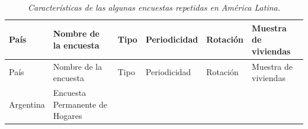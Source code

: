 \documentclass[12pt,spanish,]{book}
\begin{document}
\begin{longtable}[]{@{}llllll@{}}
\caption{\emph{Características de las algunas encuestas repetidas en América Latina.}}\tabularnewline
\toprule
\begin{minipage}[b]{0.13\columnwidth}\raggedright
País\strut
\end{minipage} & \begin{minipage}[b]{0.38\columnwidth}\raggedright
Nombre de la encuesta\strut
\end{minipage} & \begin{minipage}[b]{0.06\columnwidth}\raggedright
Tipo\strut
\end{minipage} & \begin{minipage}[b]{0.08\columnwidth}\raggedright
Periodicidad\strut
\end{minipage} & \begin{minipage}[b]{0.06\columnwidth}\raggedright
Rotación\strut
\end{minipage} & \begin{minipage}[b]{0.13\columnwidth}\raggedright
Muestra de viviendas\strut
\end{minipage}\tabularnewline
\midrule
\endfirsthead
\toprule
\begin{minipage}[b]{0.13\columnwidth}\raggedright
País\strut
\end{minipage} & \begin{minipage}[b]{0.38\columnwidth}\raggedright
Nombre de la encuesta\strut
\end{minipage} & \begin{minipage}[b]{0.06\columnwidth}\raggedright
Tipo\strut
\end{minipage} & \begin{minipage}[b]{0.08\columnwidth}\raggedright
Periodicidad\strut
\end{minipage} & \begin{minipage}[b]{0.06\columnwidth}\raggedright
Rotación\strut
\end{minipage} & \begin{minipage}[b]{0.13\columnwidth}\raggedright
Muestra de viviendas\strut
\end{minipage}\tabularnewline
\midrule
\endhead
\begin{minipage}[t]{0.13\columnwidth}\raggedright
Argentina\strut
\end{minipage} & \begin{minipage}[t]{0.38\columnwidth}\raggedright
Encuesta Permanente de Hogares\strut
\end{minipage} & \begin{minipage}[t]{0.06\columnwidth}\raggedright

\end{minipage}
\end{longtable}
\end{document}

